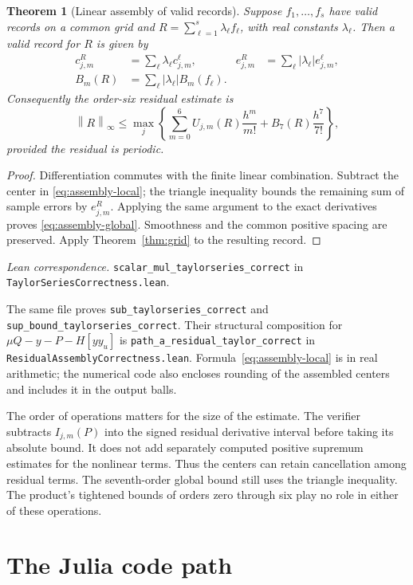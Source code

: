 \documentclass[11pt]{article}
\newtheorem{theorem}{Theorem}[section]
\theoremstyle{definition}
\theoremstyle{remark}
\newcommand{\norminf}[1]{\left\|#1\right\|_{\infty}}
\newcommand{\code}[1]{\nolinkurl{#1}}
\newcommand{\leanref}[2]{\par\smallskip\noindent\textit{Lean correspondence.}
  \code{#1} in \code{#2}.\par\smallskip}
\numberwithin{equation}{section}
\begin{document}
\begin{theorem}[Linear assembly of valid records]
\label{thm:assembly}
Suppose $f_1,\ldots,f_s$ have valid records on a common grid and
$R=\sum_{\ell=1}^{s}\lambda_\ell f_\ell$, with real constants
$\lambda_\ell$. Then a valid record for $R$ is given by
\begin{align}
 c^R_{j,m}&=\sum_\ell\lambda_\ell c^\ell_{j,m},&
 e^R_{j,m}&=\sum_\ell|\lambda_\ell|e^\ell_{j,m},\label{eq:assembly-local}\\
 B_m(R)&=\sum_\ell|\lambda_\ell|B_m(f_\ell).
 \label{eq:assembly-global}
\end{align}
Consequently the order-six residual estimate is
\begin{equation}
 \norminf{R}\leq
 \max_j\left\{\sum_{m=0}^{6}U_{j,m}(R)\frac{h^m}{m!}
                +B_7(R)\frac{h^7}{7!}\right\},
 \label{eq:final-residual}
\end{equation}
provided the residual is periodic.
\end{theorem}
\begin{proof}
Differentiation commutes with the finite linear combination. Subtract the
center in \eqref{eq:assembly-local}; the triangle inequality bounds the
remaining sum of sample errors by $e^R_{j,m}$. Applying the same argument
to the exact derivatives proves \eqref{eq:assembly-global}. Smoothness
and the common positive spacing are preserved. Apply
Theorem~\ref{thm:grid} to the resulting record.
\end{proof}
\leanref{scalar_mul_taylorseries_correct}{TaylorSeriesCorrectness.lean}
The same file proves \code{sub_taylorseries_correct} and
\code{sup_bound_taylorseries_correct}. Their structural composition for
$\mu Q-y-P-H[yy_u]$ is \code{path_a_residual_taylor_correct} in
\code{ResidualAssemblyCorrectness.lean}. Formula~\eqref{eq:assembly-local}
is in real arithmetic; the numerical code also encloses rounding of the
assembled centers and includes it in the output balls.

The order of operations matters for the size of the estimate. The verifier
subtracts $I_{j,m}(P)$ into the signed residual derivative interval before
taking its absolute bound. It does not add separately computed positive
supremum estimates for the nonlinear terms. Thus the centers can retain
cancellation among residual terms. The seventh-order global bound still
uses the triangle inequality. The product's tightened bounds of orders
zero through six play no role in either of these operations.

\section{The Julia code path}
\label{sec:julia}
\end{document}
